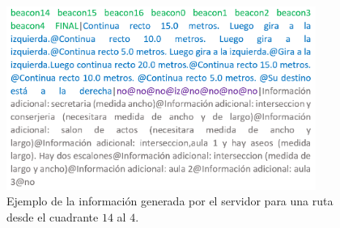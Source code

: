 \begin{itemize}
	\begin{figure}[t]
		\centering
		\includegraphics[width=0.9\textwidth]{Imagenes/Capitulo4/ejemploRuta}
		\caption{Ejemplo de la información generada por el servidor para una ruta desde el cuadrante $14$ al $4$.}
		\label{fig:ejemplo_ruta}
	\end{figure}
	

\end{itemize}
